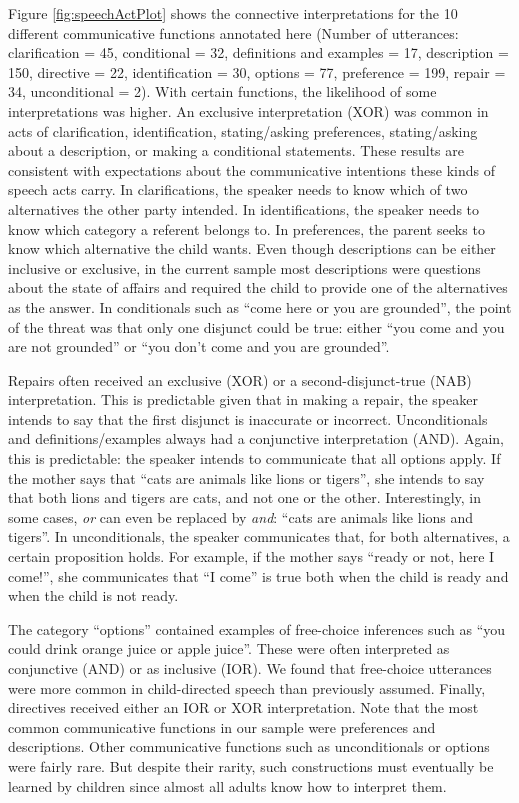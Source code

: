 \documentclass[
  ,man,floatsintext]{apa6}
\begin{document}
Figure \ref{fig:speechActPlot} shows the connective interpretations for the 10 different communicative functions annotated here (Number of utterances: clarification = 45, conditional = 32, definitions and examples = 17, description = 150, directive = 22, identification = 30, options = 77, preference = 199, repair = 34, unconditional = 2). With certain functions, the likelihood of some interpretations was higher. An exclusive interpretation (XOR) was common in acts of clarification, identification, stating/asking preferences, stating/asking about a description, or making a conditional statements. These results are consistent with expectations about the communicative intentions these kinds of speech acts carry. In clarifications, the speaker needs to know which of two alternatives the other party intended. In identifications, the speaker needs to know which category a referent belongs to. In preferences, the parent seeks to know which alternative the child wants. Even though descriptions can be either inclusive or exclusive, in the current sample most descriptions were questions about the state of affairs and required the child to provide one of the alternatives as the answer. In conditionals such as ``come here or you are grounded'', the point of the threat was that only one disjunct could be true: either ``you come and you are not grounded'' or ``you don't come and you are grounded''.

Repairs often received an exclusive (XOR) or a second-disjunct-true (NAB) interpretation. This is predictable given that in making a repair, the speaker intends to say that the first disjunct is inaccurate or incorrect. Unconditionals and definitions/examples always had a conjunctive interpretation (AND). Again, this is predictable: the speaker intends to communicate that all options apply. If the mother says that ``cats are animals like lions or tigers'', she intends to say that both lions and tigers are cats, and not one or the other. Interestingly, in some cases, \emph{or} can even be replaced by \emph{and}: ``cats are animals like lions and tigers''. In unconditionals, the speaker communicates that, for both alternatives, a certain proposition holds. For example, if the mother says ``ready or not, here I come!'', she communicates that ``I come'' is true both when the child is ready and when the child is not ready.

The category ``options'' contained examples of free-choice inferences such as ``you could drink orange juice or apple juice''. These were often interpreted as conjunctive (AND) or as inclusive (IOR). We found that free-choice utterances were more common in child-directed speech than previously assumed. Finally, directives received either an IOR or XOR interpretation. Note that the most common communicative functions in our sample were preferences and descriptions. Other communicative functions such as unconditionals or options were fairly rare. But despite their rarity, such constructions must eventually be learned by children since almost all adults know how to interpret them.
\end{document}
